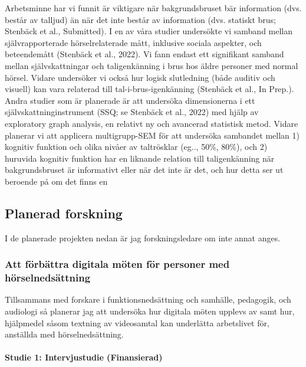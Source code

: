 \documentclass[]{article}
\begin{document}
Arbetsminne har vi funnit är viktigare när bakgrundsbruset bär
information (dvs. består av talljud) än när det inte består av
information (dvs. statiskt brus; Stenbäck et al., Submitted). I en av
våra studier undersökte vi samband mellan självrapporterade
hörselrelaterade mått, inklusive sociala aspekter, och beteendemått
(Stenbäck et al., 2022). Vi fann endast ett signifikant samband mellan
självskattningar och taligenkänning i brus hos äldre personer med normal
hörsel. Vidare undersöker vi också hur logisk slutledning (både auditiv
och visuell) kan vara relaterad till tal-i-brus-igenkänning (Stenbäck et
al., In Prep.). Andra studier som är planerade är att undersöka
dimensionerna i ett självskattninginstrument (SSQ; se Stenbäck et al.,
2022) med hjälp av exploratory graph analysis, en relativt ny och
avancerad statistisk metod. Vidare planerar vi att applicera
multigrupp-SEM för att undersöka sambandet mellan 1) kognitiv funktion
och olika nivåer av taltrösklar (eg.., 50\%, 80\%), och 2) huruvida
kognitiv funktion har en liknande relation till taligenkänning när
bakgrundsbruset är informativt eller när det inte är det, och hur detta
ser ut beroende på om det finns en

\hypertarget{planerad-forskning}{%
\subsection{Planerad forskning}\label{planerad-forskning}}

I de planerade projekten nedan är jag forskningsledare om inte annat
anges.

\hypertarget{att-fuxf6rbuxe4ttra-digitala-muxf6ten-fuxf6r-personer-med-huxf6rselnedsuxe4ttning}{%
\subsubsection{Att förbättra digitala möten för personer med
hörselnedsättning}\label{att-fuxf6rbuxe4ttra-digitala-muxf6ten-fuxf6r-personer-med-huxf6rselnedsuxe4ttning}}

Tillsammans med forskare i funktionsnedsättning och samhälle, pedagogik,
och audiologi så planerar jag att undersöka hur digitala möten upplevs
av samt hur, hjälpmedel såsom textning av videosamtal kan underlätta
arbetslivet för, anställda med hörselnedsättning.

\hypertarget{studie-1-intervjustudie-finansierad}{%
\paragraph{Studie 1: Intervjustudie
(Finansierad)}\label{studie-1-intervjustudie-finansierad}}
\end{document}
